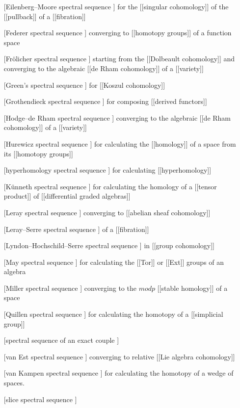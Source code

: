 \documentclass[12pt,titlepage]{article}
\theoremstyle{plain}
\theoremstyle{definition}
\theoremstyle{remark}
\begin{document}
\begin{itemize}
\item [[Eilenberg–Moore spectral sequence]] for the [[singular cohomology]] of the [[pullback]] of a [[fibration]]


\item [[Federer spectral sequence]] converging to [[homotopy groups]] of a function space


\item [[Frölicher spectral sequence]] starting from the [[Dolbeault cohomology]] and converging to the algebraic [[de Rham cohomology]] of a [[variety]]


\item [[Green's spectral sequence]] for [[Koszul cohomology]]


\item [[Grothendieck spectral sequence]] for composing [[derived functors]]


\item [[Hodge–de Rham spectral sequence]] converging to the algebraic [[de Rham cohomology]] of a [[variety]]


\item [[Hurewicz spectral sequence]] for calculating the [[homology]] of a space from its [[homotopy groups]]


\item [[hyperhomology spectral sequence]] for calculating [[hyperhomology]]


\item [[Künneth spectral sequence]] for calculating the homology of a [[tensor product]] of [[differential graded algebras]]


\item [[Leray spectral sequence]] converging to [[abelian sheaf cohomology]]


\item [[Leray–Serre spectral sequence]] of a [[fibration]]


\item [[Lyndon–Hochschild–Serre spectral sequence]] in [[group cohomology]]


\item [[May spectral sequence]] for calculating the [[Tor]] or [[Ext]] groups of an algebra


\item [[Miller spectral sequence]] converging to the $mod p$ [[stable homology]] of a space


\item [[Quillen spectral sequence]] for calculating the homotopy of a [[simplicial group]]


\item [[spectral sequence of an exact couple]]


\item [[van Est spectral sequence]] converging to relative [[Lie algebra cohomology]]


\item [[van Kampen spectral sequence]] for calculating the homotopy of a wedge of spaces.


\item [[slice spectral sequence]]



\end{itemize}
\end{document}
